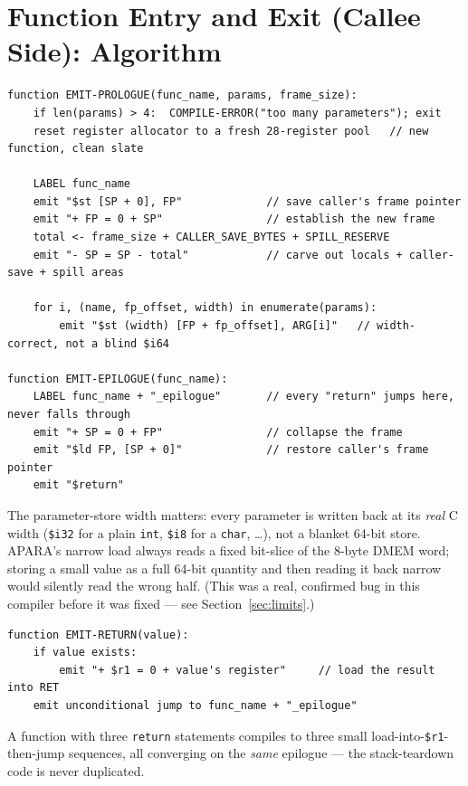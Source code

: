 \documentclass[11pt,a4paper]{article}
\begin{document}
\section{Function Entry and Exit (Callee Side): Algorithm}
\label{sec:callee}

\begin{lstlisting}[style=pseudostyle, caption={\texttt{\_gen\_IRFuncBegin} / \texttt{\_gen\_IRFuncEnd}, codegen.py:572--619 (essence)}]
function EMIT-PROLOGUE(func_name, params, frame_size):
    if len(params) > 4:  COMPILE-ERROR("too many parameters"); exit
    reset register allocator to a fresh 28-register pool   // new function, clean slate

    LABEL func_name
    emit "$st [SP + 0], FP"             // save caller's frame pointer
    emit "+ FP = 0 + SP"                // establish the new frame
    total <- frame_size + CALLER_SAVE_BYTES + SPILL_RESERVE
    emit "- SP = SP - total"            // carve out locals + caller-save + spill areas

    for i, (name, fp_offset, width) in enumerate(params):
        emit "$st (width) [FP + fp_offset], ARG[i]"   // width-correct, not a blind $i64

function EMIT-EPILOGUE(func_name):
    LABEL func_name + "_epilogue"       // every "return" jumps here, never falls through
    emit "+ SP = 0 + FP"                // collapse the frame
    emit "$ld FP, [SP + 0]"             // restore caller's frame pointer
    emit "$return"
\end{lstlisting}

The parameter-store width matters: every parameter is written back at its \emph{real} C
width (\texttt{\$i32} for a plain \texttt{int}, \texttt{\$i8} for a \texttt{char}, \ldots),
not a blanket 64-bit store. APARA's narrow load always reads a fixed bit-slice of the
8-byte DMEM word; storing a small value as a full 64-bit quantity and then reading it back
narrow would silently read the wrong half. (This was a real, confirmed bug in this
compiler before it was fixed --- see Section~\ref{sec:limits}.)

\begin{lstlisting}[style=pseudostyle, caption={\texttt{\_gen\_IRReturn}, codegen.py:1104--1111}]
function EMIT-RETURN(value):
    if value exists:
        emit "+ $r1 = 0 + value's register"     // load the result into RET
    emit unconditional jump to func_name + "_epilogue"
\end{lstlisting}
A function with three \texttt{return} statements compiles to three small
load-into-\texttt{\$r1}-then-jump sequences, all converging on the \emph{same} epilogue
--- the stack-teardown code is never duplicated.
\end{document}
